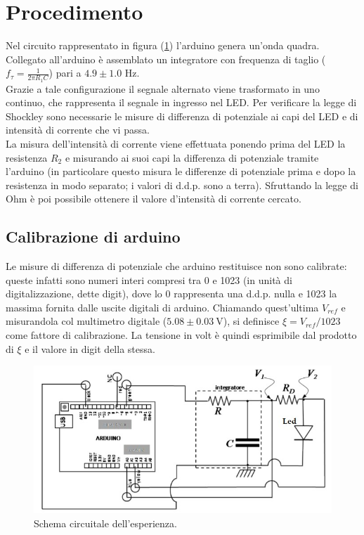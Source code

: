 \documentclass[11pt,a4paper]{article}
\begin{document}
\section{Procedimento}
	Nel circuito rappresentato in figura (\ref{fig:circuito}) l'arduino genera un'onda quadra. Collegato all'arduino è assemblato un integratore con frequenza di taglio ($f_\tau = \frac{1}{2\pi R_1 C}$) pari a $4.9\pm 1.0$ Hz.\\
	Grazie a tale configurazione il segnale alternato viene trasformato in uno continuo, che rappresenta il segnale in ingresso nel LED.
	Per verificare la legge di Shockley sono necessarie le misure di differenza di potenziale ai capi del LED e di intensità di corrente che vi passa. \\
	La misura dell'intensità di corrente viene effettuata ponendo prima del LED la resistenza $R_2$ e misurando ai suoi capi la differenza di potenziale tramite l'arduino (in particolare questo misura le differenze di potenziale prima e dopo la resistenza in modo separato; i valori di d.d.p. sono a terra). Sfruttando la legge di Ohm è poi possibile ottenere il valore d'intensità di corrente cercato.
	\subsection{Calibrazione di arduino}
		Le misure di differenza di potenziale che arduino restituisce non sono calibrate: queste infatti sono numeri interi compresi tra 0 e 1023 (in unità di digitalizzazione, dette digit), dove lo 0 rappresenta una d.d.p. nulla e 1023 la massima fornita dalle uscite digitali di arduino.
		Chiamando quest'ultima $V_{ref}$ e misurandola col multimetro digitale ($5.08 \pm 0.03 \ $V), si definisce $\xi = {V_{ref}}/1023$ come fattore di calibrazione. La tensione in volt è quindi esprimibile dal prodotto di $\xi$ e il valore in digit della stessa.
		
		
	
\begin{figure}[h!]
	\centering
	\includegraphics[width=1\linewidth]{circuitoled.png}
	\caption{Schema circuitale dell'esperienza.}
	\label{fig:circuito}
\end{figure}
\end{document}
